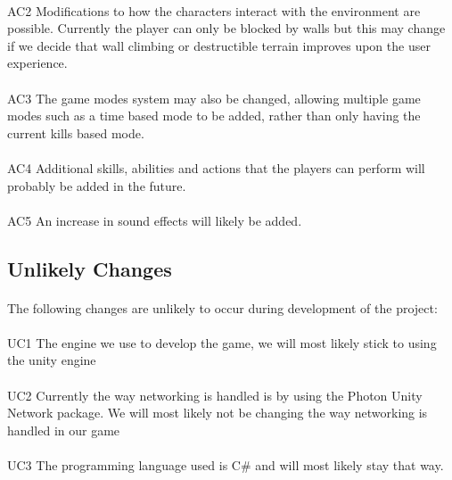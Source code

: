 \documentclass[12pt, titlepage]{article}
\begin{document}
\paragraph{}AC2 Modifications to how the characters interact with the environment are possible. Currently the player can only be blocked by walls but this may change if we decide that wall climbing or destructible terrain improves upon the user experience.
\paragraph{}AC3 The game modes system may also be changed, allowing multiple game modes such as a time based mode to be added, rather than only having the current kills based mode.
\paragraph{}AC4 Additional skills, abilities and actions that the players can perform will probably be added in the future.
\paragraph{}AC5 An increase in sound effects will likely be added.

\subsection{Unlikely Changes}
\paragraph{}The following changes are unlikely to occur during development of the project:
\paragraph{}UC1 The engine we use to develop the game, we will most likely stick to using the unity engine
\paragraph{}UC2 Currently the way networking is handled is by using the Photon Unity Network package. We will most likely not be changing the way networking is handled in our game
\paragraph{}UC3 The programming language used is C\# and will most likely stay that way.
\end{document}

